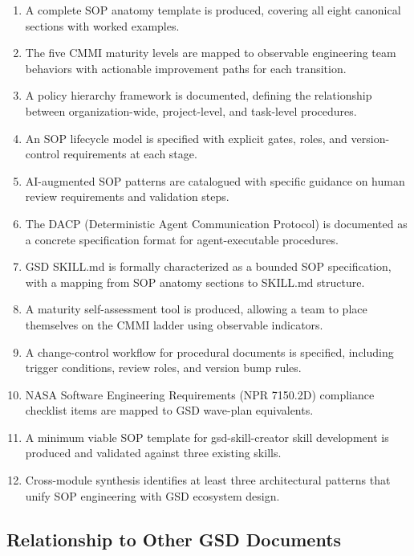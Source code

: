\documentclass[11pt,letterpaper]{article}
\begin{document}
\begin{enumerate}[leftmargin=1.5em]
  \item A complete SOP anatomy template is produced, covering all eight canonical sections with worked examples.
  \item The five CMMI maturity levels are mapped to observable engineering team behaviors with actionable improvement paths for each transition.
  \item A policy hierarchy framework is documented, defining the relationship between organization-wide, project-level, and task-level procedures.
  \item An SOP lifecycle model is specified with explicit gates, roles, and version-control requirements at each stage.
  \item AI-augmented SOP patterns are catalogued with specific guidance on human review requirements and validation steps.
  \item The DACP (Deterministic Agent Communication Protocol) is documented as a concrete specification format for agent-executable procedures.
  \item GSD SKILL.md is formally characterized as a bounded SOP specification, with a mapping from SOP anatomy sections to SKILL.md structure.
  \item A maturity self-assessment tool is produced, allowing a team to place themselves on the CMMI ladder using observable indicators.
  \item A change-control workflow for procedural documents is specified, including trigger conditions, review roles, and version bump rules.
  \item NASA Software Engineering Requirements (NPR 7150.2D) compliance checklist items are mapped to GSD wave-plan equivalents.
  \item A minimum viable SOP template for gsd-skill-creator skill development is produced and validated against three existing skills.
  \item Cross-module synthesis identifies at least three architectural patterns that unify SOP engineering with GSD ecosystem design.
\end{enumerate}

\subsection{Relationship to Other GSD Documents}
\end{document}
